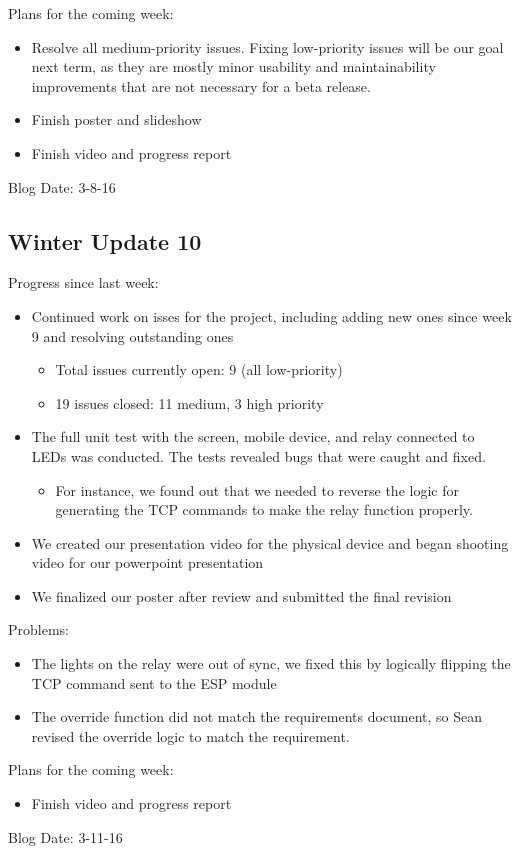Plans for the coming week: 
\begin{itemize}
\item Resolve all medium-priority issues.  Fixing low-priority issues will be our goal next term, as they are mostly minor usability and maintainability improvements that are not necessary for a beta release. 
\item Finish poster and slideshow
\item Finish video and progress report
\end{itemize}
Blog Date: 3-8-16

\subsection{Winter Update 10}
Progress since last week:
\begin{itemize}
\item Continued work on isses for the project, including adding new ones since week 9 and resolving outstanding ones
\begin{itemize}
\item Total issues currently open: 9 (all low-priority)
\item 19 issues closed: 11 medium, 3 high priority
\end{itemize}
\item The full unit test with the screen, mobile device, and relay connected to LEDs was conducted. The tests revealed bugs that were caught and fixed.
\begin{itemize}
\item For instance, we found out that we needed to reverse the logic for generating the TCP commands to make the relay function properly.
\end{itemize}
\item We created our presentation video for the physical device and began shooting video for our powerpoint presentation
\item We finalized our poster after review and submitted the final revision
\end{itemize}
Problems:
\begin{itemize}
\item The lights on the relay were out of sync, we fixed this by logically flipping the TCP command sent to the ESP module
\item The override function did not match the requirements document, so Sean revised the override logic to match the requirement.
\end{itemize}
Plans for the coming week: 
\begin{itemize}
\item Finish video and progress report
\end{itemize}
Blog Date: 3-11-16

